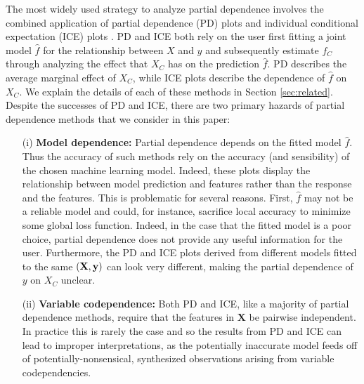 \documentclass[12pt]{article}
\begin{document}
The most widely used strategy to analyze partial dependence involves the combined application of partial dependence (PD) plots \citep{PDP} and individual conditional expectation (ICE) plots \citep{ICE}. PD and ICE both rely on the user first fitting a joint model $\widehat{f}$ for the relationship between $X$ and $y$ and subsequently estimate $f_C$ through analyzing the effect that $X_C$ has on the prediction $\widehat{f}$. PD describes the average marginal effect of $X_C$, while ICE plots describe the dependence of $\widehat{f}$ on $X_C$. We explain the details of each of these methods in Section \ref{sec:related}. Despite the successes of PD and ICE, there are two primary hazards of partial dependence methods that we consider in this paper: 
\begin{itemize}
	\item[(i)] {\bf Model dependence:} Partial dependence depends on the fitted model $\widehat{f}$. Thus the accuracy of such methods rely on the accuracy (and sensibility) of the chosen machine learning model. Indeed, these plots display the relationship between model prediction and features rather than the response and the features. This is problematic for several reasons. First, $\widehat{f}$ may not be a reliable model and could, for instance, sacrifice local accuracy to minimize some global loss function. Indeed, in the case that the fitted model is a poor choice, partial dependence does not provide any useful information for the user. Furthermore, the PD and ICE plots derived from different models fitted to the same $({\bf X}, {\bf y})$ can look very different, making the partial dependence of $y$ on $X_C$ unclear.
	\item[(ii)] {\bf Variable codependence:} Both PD and ICE, like a majority of partial dependence methods, require that the features in $\mathbf{X}$ be pairwise independent. In practice this is rarely the case and so the results from PD and ICE can lead to improper interpretations, as the potentially inaccurate model feeds off of potentially-nonsensical, synthesized observations arising from variable codependencies.  
\end{itemize}
\end{document}
